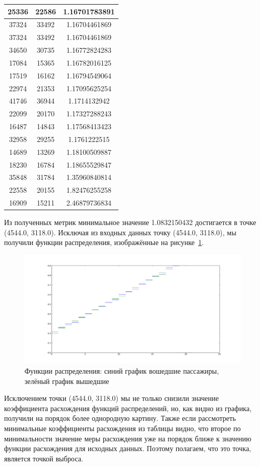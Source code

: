 \documentclass[12pt,a4paper,oneside]{extarticle}
\begin{document}
\begin{table}[ht!]
\begin{tabular}{|c|c|c|}
        25336 & 22586 & 1.16701783891 \\ \hline 
        37324 & 33492 & 1.16704461869 \\ \hline 
        37324 & 33492 & 1.16704461869 \\ \hline 
        34650 & 30735 & 1.16772824283 \\ \hline 
        17084 & 15365 & 1.16782016125 \\ \hline 
        17519 & 16162 & 1.16794549064 \\ \hline 
        22974 & 21353 & 1.17095625254 \\ \hline 
        41746 & 36944 & 1.1714132942 \\ \hline 
        22099 & 20170 & 1.17327288243 \\ \hline 
        16487 & 14843 & 1.17568413423 \\ \hline 
        32958 & 29255 & 1.1761222515 \\ \hline 
        14689 & 13269 & 1.18100509887 \\ \hline 
        18230 & 16784 & 1.18655529847 \\ \hline 
        35848 & 31784 & 1.35960840814 \\ \hline 
        22558 & 20155 & 1.82476255258 \\ \hline 
        16909 & 15211 & 2.46879736834 \\ \hline 

        \end{tabular}
    \end{table}

    Из полученных метрик минимальное значение 1.0832150432 достигается в точке (4544.0, 3118.0).
    Исключая из входных данных точку (4544.0, 3118.0), мы получили функции распределения, изображённые на рисунке~\ref{pic:case2}.
    \begin{figure}[ht!]
        \center
        \includegraphics[scale=0.45]{figure_2.png}
        \caption{Функции распределения: синий график вошедшие пассажиры, зелёный график вышедшие}
        \label{pic:case2}
    \end{figure}

    Исключением точки (4544.0, 3118.0) мы не только снизили значение коэффициента расхождения функций распределений, но, как видно из графика, получили на порядок более однородную картину. Также если рассмотреть минимальные коэффициенты расхождения из таблицы видно, что второе по минимальности значение меры расхождения уже на порядок ближе к значению функции расхождения для исходных данных. Поэтому полагаем, что это точка, является точкой выброса.
\end{document}
